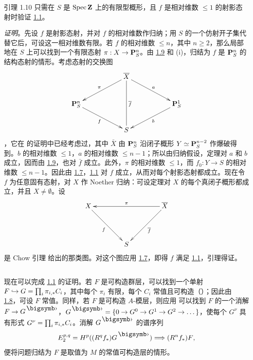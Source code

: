 \begin{enonce*}{引理 1.10}
只需在 $S$ 是 $\operatorname{Spec}\mathbf{Z}$ 上的有限型概形，且 $f$ 是相对维数 $\leq 1$ 的射影态射时验证 \hyperref[XIV.thm1.1]{1.1}。
\end{enonce*}

\noindent
\emph{证明}。先设 $f$ 是射影态射，并对 $f$ 的相对维数作归纳；用 $S$ 的一个仿射开子集代替它后，可设这一相对维数有限。若 $f$ 的相对维数 $\leq n$，其中 $n\geq 2$，那么局部地在 $S$ 上可以找到一个有限态射 $\pi:X\rightarrow\mathbf{P}^n_S$。由 \hyperref[XIV.lem1.9]{1.9} 和  (i)，归结为 $f$ 是 $\mathbf{P}^n_S$ 的结构态射的情形。考虑态射的交换图
$$
\xymatrix@C=2cm{
                   & \bar{X}\ar[ld]_{\sisi{}{\pi}} \ar[rd]^{a} \ar@{-}[dd]^{\bar{f}} &       \\
\PP^{n}_S \ar[rd]_{f}  &                  &\PP^{1}_S \ar[ld]^{b}\\
                   &  S                          &
}
$$
，它在  的证明中已经考虑过，其中 $\bar{X}$ 由 $\mathbf{P}^n_S$ 沿闭子概形 $Y\simeq\mathbf{P}^{n-2}_S$ 作爆破得到。$b$ 的相对维数 $\leq1$，$a$ 的相对维数 $\leq n-1$；所以由归纳假设，定理对 $a$ 和 $b$ 成立，因而由 \hyperref[XIV.lem1.9]{1.9}，也对 $\bar{f}$ 成立。此外，$\pi$ 的相对维数 $\leq1$，而 $f_0:Y\rightarrow S$ 的相对维数 $\leq n-1$。因此由 \hyperref[XIV.lem1.7]{1.7}，\hyperref[XIV.thm1.1]{1.1} 对 $f$ 成立，从而对每个射影态射都成立。现在令 $f$ 为任意固有态射，对 $X$ 作 Noether 归纳：可设定理对 $X$ 的每个真闭子概形都成立，并且 $X\neq∅$。设
$$
\xymatrix@=1.5cm{
X  \ar[rd]_{f}          &           &\bar{X} \ar[ll]_{\pi} \ar[ld]^{\bar{f}}\\
                        &    S       &
}
$$
是 Chow 引理  给出的那类\pageoriginale 图。对这个图应用 \hyperref[XIV.lem1.7]{1.7}，即得 $f$ 满足 \hyperref[XIV.thm1.1]{1.1}，引理得证。

\setcounter{subsection}{10}
\subsection{}
现在可以完成 \hyperref[XIV.thm1.1]{1.1} 的证明。若 $F$ 是可构造群层，可以找到一个单射 $F\hookrightarrow G=\prod_i\pi_{i,\ast}C_i$，其中每个 $\pi_i$ 有限，每个 $C_i$ 常值且可构造（）；因此由 \hyperref[XIV.lem1.8]{1.8}，可设 $F$ 常值。同样，若 $F$ 是可构造 $A$-模层，则应用  可以找到 $F$ 的一个消解 $F\rightarrow G^{\bigdot}$，$G^{\bigdot}=\{0\rightarrow G^0\rightarrow G^1\rightarrow G^2\rightarrow\ldots\}$，使每个 $G^{\nu}$ 具有形式 $G^{\nu}=\prod_i\pi_{i,\ast}C_i$。消解 $G^{\bigdot}$ 的谱序列
$$
E^{p,q}_2=H^{\sisi{q}{p}}((R^{q}f_{\ast})G^{\bigdot})\Longrightarrow
(R^{n}f_{\ast})F{\quoi},
$$
便将问题归结为 $F$ 是取值为 $M$ 的常值可构造层的情形。

